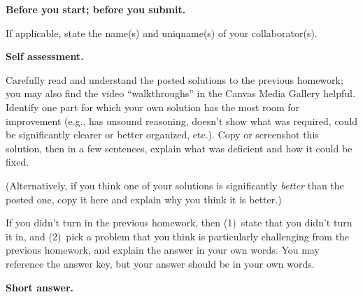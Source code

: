 \documentclass[11pt,addpoints]{exam}
\begin{document}
\hwpreface

\pointsinmargin
{}
\marginpointname{ \points}
\marginbonuspointname{ \bonuspoints}

\begin{questions}
  \addtocounter{question}{-1}

  \question[0] \textbf{Before you start; before you submit.}
  
  If applicable, state the name(s) and uniqname(s) of your collaborator(s).

  \begin{solution}

  \end{solution}

  \question[10] \textbf{Self assessment.}
  
  Carefully read and understand the posted solutions to the previous homework; you may also find the video ``walkthroughs'' in the Canvas Media Gallery helpful.
  Identify one part for which your own solution has the most room for improvement (e.g., has unsound reasoning, doesn’t show what was required, could be significantly clearer or better organized, etc.).
  Copy or screenshot this solution, then in a few sentences, explain what was deficient and how it could be fixed.

  (Alternatively, if you think one of your solutions is significantly \emph{better} than the posted one, copy it here and explain why you think it is better.)

  If you didn't turn in the previous homework, then (1)~state that you didn't turn it in, and (2)~pick a problem that you think is particularly challenging from the previous homework, and explain the answer in your own words.
  You may reference the answer key, but your answer should be in your own words.

  \begin{solution}

  \end{solution}

  \question \textbf{Short answer.}

\end{questions}
\end{document}
